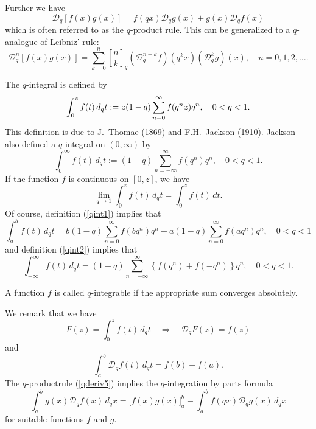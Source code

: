 \documentclass[envcountchap,graybox]{svmono}
\begin{document}
Further we have
\begin{equation}
\label{qderiv5}
\mathcal{D}_q\left[f(x)g(x)\right]=
f(qx)\mathcal{D}_qg(x)+g(x)\mathcal{D}_qf(x)
\end{equation}
which is often referred to as the $q$-product rule. This can be generalized
to a $q$-analogue of Leibniz' rule:
\begin{equation}
\label{qderiv6}
\mathcal{D}_q^n\left[f(x)g(x)\right]=\sum_{k=0}^n\genfrac{[}{]}{0pt}{}{n}{k}_q
\left(\mathcal{D}_q^{n-k}f\right)(q^kx)\left(\mathcal{D}_q^kg\right)(x),
\quad n=0,1,2,\ldots.
\end{equation}

The $q$-integral is defined by
\begin{equation}
\label{qint1}\index{q-Integral@$q$-Integral}
\index{Jackson-Thomae q-integral@Jackson-Thomae $q$-integral}
\int_0^zf(t)\,d_qt:=z(1-q)\sum_{n=0}^{\infty}f(q^nz)q^n,\quad 0<q<1.
\end{equation}
This definition is due to J.~Thomae (1869) and F.H.~Jackson (1910). Jackson also defined a
$q$-integral on $(0,\infty)$ by
\begin{equation}
\label{qint2}
\int_0^{\infty}f(t)\,d_qt:=(1-q)\sum_{n=-\infty}^{\infty}f(q^n)q^n,\quad 0<q<1.
\end{equation}
If the function $f$ is continuous on $[0,z]$, we have
$$\lim\limits_{q\rightarrow 1}\int_0^zf(t)\,d_qt=\int_0^zf(t)\,dt.$$
Of course, definition (\ref{qint1}) implies that
$$\int_a^bf(t)\,d_qt=b(1-q)\sum_{n=0}^{\infty}f(bq^n)q^n-a(1-q)\sum_{n=0}^{\infty}f(aq^n)q^n,\quad 0<q<1$$
and definition (\ref{qint2}) implies that
$$\int_{-\infty}^{\infty}f(t)\,d_qt=(1-q)\sum_{n=-\infty}^{\infty}\left\{f(q^n)+f(-q^n)\right\}q^n,\quad 0<q<1.$$

\noindent
A function $f$ is called $q$-integrable if the appropriate sum converges absolutely.

\noindent
We remark that we have
$$F(z)=\int_0^zf(t)\,d_qt\quad\Longrightarrow\quad\mathcal{D}_qF(z)=f(z)$$
and
$$\int_a^b\mathcal{D}_qf(t)\,d_qt=f(b)-f(a).$$
The $q$-productrule (\ref{qderiv5}) implies the $q$-integration by parts formula
\begin{equation}
\label{qpartint}
\int_a^bg(x)\mathcal{D}_qf(x)\,d_qx=\Big[f(x)g(x)\Big]_a^b-\int_a^bf(qx)\mathcal{D}_qg(x)\,d_qx
\end{equation}
for suitable functions $f$ and $g$.

\vspace{5mm}
\end{document}
